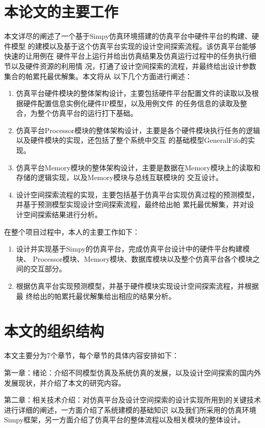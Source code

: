 \section{本论文的主要工作}
本文详尽的阐述了一个基于Simpy仿真环境搭建的仿真平台中硬件平台的构建、硬件模型
的建模以及基于这个仿真平台实现的设计空间探索流程。该仿真平台能够快速的让用例在
硬件平台上运行并给出仿真结果及仿真运行过程中的任务执行细节以及硬件资源的利用情
况，打通了设计空间探索的流程，并最终给出设计参数集合的帕累托最优解集。本文将从
以下几个方面进行阐述：

\begin{enumerate}
    \item 仿真平台硬件模块的整体架构设计，主要包括硬件平台配置文件的读取以及根据硬件配置信息实例化硬件IP模型，以及用例文件
    的任务信息的读取及整合，为整个仿真平台的运行打下基础。
    \item 仿真平台Processor模块的整体架构设计，主要是各个硬件模块执行任务的逻辑以及硬件模块的实现，还包括了整个系统中交互
    的基础模型GeneralFifo的实现。
    \item 仿真平台Memory模块的整体架构设计，主要是数据在Memory模块上的读取和存储的逻辑实现，以及Memory模块与总线互联模块的
    交互设计。
    \item 设计空间探索流程的实现，主要包括基于仿真平台实现仿真过程的预测模型，并基于预测模型实现设计空间探索流程，最终给出帕
    累托最优解集，并对设计空间探索结果进行分析。
\end{enumerate}

在整个项目过程中，本人的主要工作如下：

\begin{enumerate}
    \item 设计并实现基于Simpy的仿真平台，完成仿真平台设计中的硬件平台构建模块、
    Processor模块、Memory模块、数据库模块以及整个仿真平台各个模块之间的交互部分。
    \item 根据仿真平台实现预测模型，并基于硬件模块实现设计空间探索流程，并根据最
    终给出的帕累托最优解集给出相应的结果分析。
\end{enumerate}

\section{本文的组织结构}
本文主要分为7个章节，每个章节的具体内容安排如下：

第一章：绪论：介绍不同模型仿真及系统仿真的发展，以及设计空间探索的国内外发展现状，并介绍了本文的研究内容。

第二章：相关技术介绍：对仿真平台及设计空间探索的设计实现所用到的关键技术进行详细的阐述，一方面介绍了系统建模的基础知识
以及我们所采用的仿真环境Simpy框架，另一方面介绍了仿真平台的整体流程以及相关模块的整体设计。

